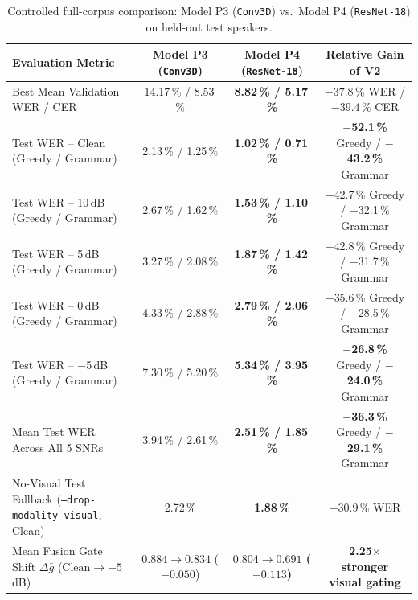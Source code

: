 \documentclass[11pt,a4paper]{article}
\newcommand{\code}[1]{\texttt{\small #1}}
\begin{document}
\begin{table}[htbp]
\centering\small
\caption{Controlled full-corpus comparison: Model P3 (\code{Conv3D}) vs.\ Model P4 (\code{ResNet-18}) on held-out test speakers.}
\label{tab:p3_vs_p4}
\begin{tabularx}{\textwidth}{@{}Xccc@{}}
\toprule
\rowcolor{white}\sffamily\bfseries Evaluation Metric & \textbf{Model P3 (\code{Conv3D})} & \textbf{Model P4 (\code{ResNet-18})} & \textbf{Relative Gain of V2} \\
\midrule
Best Mean Validation WER / CER & 14.17\,\% / 8.53\,\% & \textbf{8.82\,\% / 5.17\,\%} & $-37.8\,\%$ WER / $-39.4\,\%$ CER \\
Test WER -- Clean (Greedy / Grammar) & 2.13\,\% / 1.25\,\% & \textbf{1.02\,\% / 0.71\,\%} & \textbf{$-$52.1\,\%} Greedy / \textbf{$-$43.2\,\%} Grammar \\
Test WER -- 10\,dB (Greedy / Grammar) & 2.67\,\% / 1.62\,\% & \textbf{1.53\,\% / 1.10\,\%} & $-$42.7\,\% Greedy / $-$32.1\,\% Grammar \\
Test WER -- 5\,dB (Greedy / Grammar) & 3.27\,\% / 2.08\,\% & \textbf{1.87\,\% / 1.42\,\%} & $-$42.8\,\% Greedy / $-$31.7\,\% Grammar \\
Test WER -- 0\,dB (Greedy / Grammar) & 4.33\,\% / 2.88\,\% & \textbf{2.79\,\% / 2.06\,\%} & $-$35.6\,\% Greedy / $-$28.5\,\% Grammar \\
Test WER -- $-$5\,dB (Greedy / Grammar) & 7.30\,\% / 5.20\,\% & \textbf{5.34\,\% / 3.95\,\%} & \textbf{$-$26.8\,\%} Greedy / \textbf{$-$24.0\,\%} Grammar \\
Mean Test WER Across All 5 SNRs & 3.94\,\% / 2.61\,\% & \textbf{2.51\,\% / 1.85\,\%} & \textbf{$-$36.3\,\%} Greedy / \textbf{$-$29.1\,\%} Grammar \\
No-Visual Test Fallback (\code{--drop-modality visual}, Clean) & 2.72\,\% & \textbf{1.88\,\%} & $-$30.9\,\% WER \\
Mean Fusion Gate Shift $\Delta\bar{g}$ ($\text{Clean} \to -5$\,dB) & $0.884 \to 0.834$ ($-0.050$) & \textbf{$0.804 \to 0.691$ ($-0.113$)} & \textbf{2.25$\times$ stronger visual gating} \\
\bottomrule
\end{tabularx}
\end{table}
\end{document}
